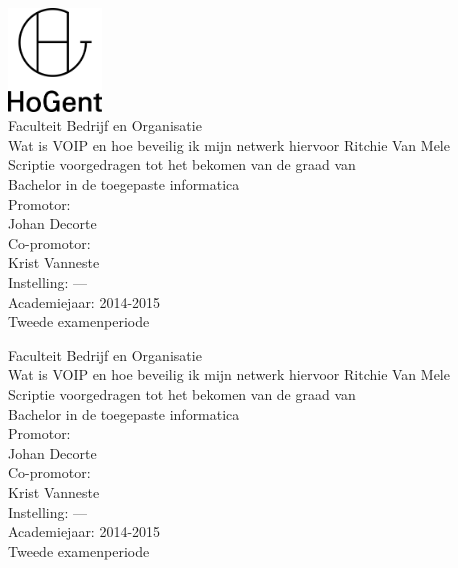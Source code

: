 \documentclass[pdftex,a4paper,12pt,twoside]{report}
\newcommand{\emptypage}{
\newpage
\thispagestyle{empty}
\mbox{}
\newpage
}
\newcommand{\student}{Ritchie Van Mele}
\newcommand{\promotor}{Johan Decorte}
\newcommand{\copromotor}{Krist Vanneste}
\newcommand{\instelling}{---}
\newcommand{\titel}{Wat is VOIP en hoe beveilig ik mijn netwerk hiervoor}
\newcommand{\faculteit}{Faculteit Bedrijf en Organisatie}
\newcommand{\rapporttype}{Scriptie voorgedragen tot het bekomen van de graad van\\Bachelor in de toegepaste informatica}
\newcommand{\academiejaar}{2014-2015}
\newcommand{\examenperiode}{Tweede examenperiode}
\begin{document}

\begin{titlepage}
  \begin{center}

    \begingroup
    \rmfamily
    \includegraphics[width=2.5cm]{img/HG-beeldmerk-woordmerk}\\[.5cm]
    \faculteit\\[3cm]
    \titel
    \vfill
    \student\\[3.5cm]
    \rapporttype\\[2cm]
    Promotor:\\
    \promotor\\
    Co-promotor:\\
    \copromotor\\[2.5cm]
    Instelling: \instelling\\[.5cm]
    Academiejaar: \academiejaar\\[.5cm]
    \examenperiode
    \endgroup

  \end{center}
  \restoregeometry
\end{titlepage}


\emptypage


\begin{titlepage}
  \begin{center}

    \begingroup
    \rmfamily
    \faculteit\\[3cm]
    \titel
    \vfill
    \student\\[3.5cm]
    \rapporttype\\[2cm]
    Promotor:\\
    \promotor\\
    Co-promotor:\\
    \copromotor\\[2.5cm]
    Instelling: \instelling\\[.5cm]
    Academiejaar: \academiejaar\\[.5cm]
    \examenperiode
    \endgroup

  \end{center}
  \restoregeometry
\end{titlepage}
\end{document}
